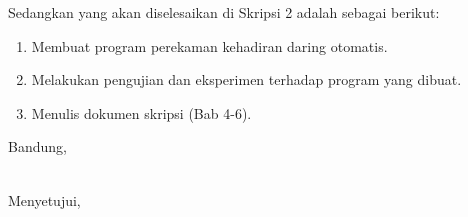 \documentclass[a4paper,twoside]{article}
\begin{document}
Sedangkan yang akan diselesaikan di Skripsi 2 adalah sebagai berikut:
\begin{enumerate}
\item Membuat program perekaman kehadiran daring otomatis.
\item Melakukan pengujian dan eksperimen terhadap program yang dibuat.
\item Menulis dokumen skripsi (Bab 4-6).
\end{enumerate}

\vspace{1cm} %
\centering Bandung, \tanggal\\
\vspace{2cm} \nama \\ 
\vspace{1cm}

Menyetujui, \\
\end{document}
